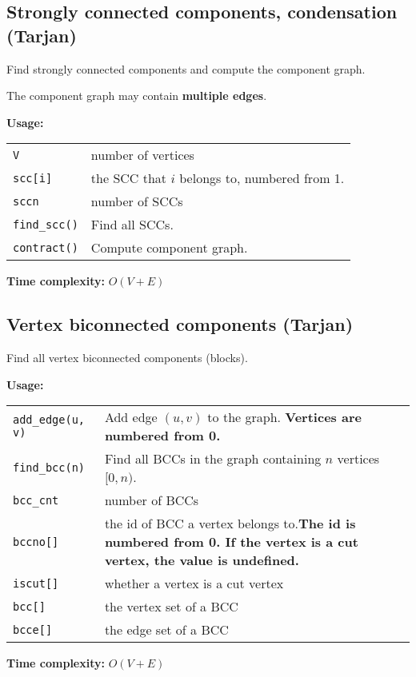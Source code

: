\subsection{Strongly connected components, condensation (Tarjan)}
Find strongly connected components and compute the component graph. \par
\Warning The component graph may contain \textbf{multiple edges}. \par
\textbf{Usage:} \\[0.1cm]
\begin{tabular}{p{2.5cm} p{9cm}}
  \lstinline|V| & number of vertices \\
  \lstinline|scc[i]| & the SCC that $i$ belongs to, numbered from 1. \\
  \lstinline|sccn| & number of SCCs \\
  \lstinline|find_scc()| & Find all SCCs. \\
  \lstinline|contract()| & Compute component graph. \\
\end{tabular} \par
\textbf{Time complexity:} $O(V + E)$ \par


\subsection{Vertex biconnected components (Tarjan)}
Find all vertex biconnected components (blocks). \par
\textbf{Usage:} \\[0.1cm]
\begin{tabular}{p{2.5cm} p{9cm}}
  \lstinline|add_edge(u, v)| & Add edge $(u, v)$ to the graph. \textbf{Vertices are numbered from 0.}\\
  \lstinline|find_bcc(n)| & Find all BCCs in the graph containing $n$ vertices $[0, n)$.  \\
  \lstinline|bcc_cnt| & number of BCCs \\
  \lstinline|bccno[]| & the id of BCC a vertex belongs to.\textbf{The id is numbered from 0. If the vertex is a cut vertex, the value is undefined.} \\
  \lstinline|iscut[]| & whether a vertex is a cut vertex \\
  \lstinline|bcc[]| & the vertex set of a BCC \\
  \lstinline|bcce[]| & the edge set of a BCC \\
\end{tabular} \par
\textbf{Time complexity:} $O(V + E)$ \par


